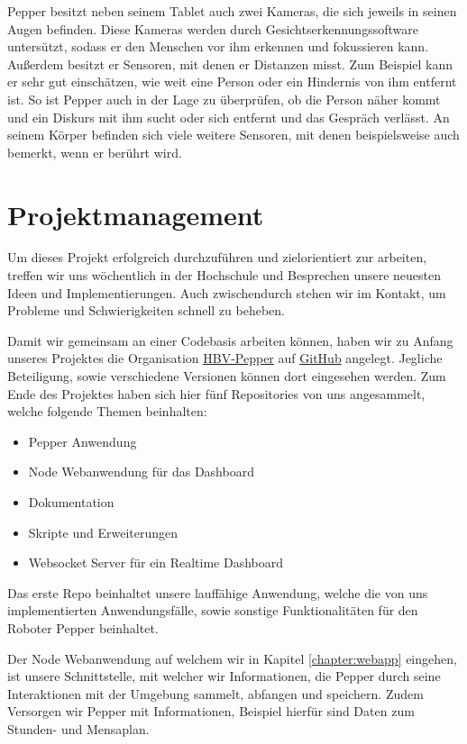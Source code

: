 Pepper besitzt neben seinem Tablet auch zwei Kameras, die sich jeweils in seinen Augen befinden. Diese Kameras werden durch Gesichtserkennungssoftware untersützt, sodass er den Menschen vor ihm erkennen und fokussieren kann. Außerdem besitzt er Sensoren, mit denen er Distanzen misst. Zum Beispiel kann er sehr gut einschätzen, wie weit eine Person oder ein Hindernis von ihm entfernt ist. So ist Pepper auch in der Lage zu überprüfen, ob die Person näher kommt und ein Diskurs mit ihm sucht oder sich entfernt und das Gespräch verlässt. An seinem Körper befinden sich viele weitere Sensoren, mit denen beispielsweise auch bemerkt, wenn er berührt wird.\\


\section{Projektmanagement}
Um dieses Projekt erfolgreich durchzuführen und zielorientiert zur arbeiten, treffen wir uns wöchentlich
in der Hochschule und Besprechen unsere neuesten Ideen und Implementierungen. Auch zwischendurch
stehen wir im Kontakt, um Probleme und Schwierigkeiten schnell zu beheben.

Damit wir gemeinsam an einer Codebasis arbeiten können, haben wir zu Anfang unseres Projektes
die Organisation \href{https://github.com/ProjectPepperHSB}{HBV-Pepper} auf
\href{https://github.com}{GitHub} angelegt. Jegliche Beteiligung, sowie verschiedene Versionen können dort eingesehen werden.
Zum Ende des Projektes haben sich hier fünf Repositories von uns angesammelt, welche folgende Themen beinhalten:
\begin{itemize}
    \item Pepper Anwendung
    \item Node Webanwendung für das Dashboard
    \item Dokumentation
    \item Skripte und Erweiterungen
    \item Websocket Server für ein Realtime Dashboard
\end{itemize}

Das erste Repo beinhaltet unsere lauffähige Anwendung, welche die von uns
implementierten Anwendungsfälle, sowie sonstige Funktionalitäten für den Roboter Pepper beinhaltet.

Der Node Webanwendung auf welchem wir in Kapitel \ref{chapter:webapp} eingehen, ist unsere Schnittstelle, mit welcher wir Informationen, die Pepper durch seine Interaktionen mit der Umgebung sammelt, abfangen und speichern. Zudem Versorgen wir Pepper mit Informationen, Beispiel hierfür sind Daten zum Stunden- und Mensaplan.


